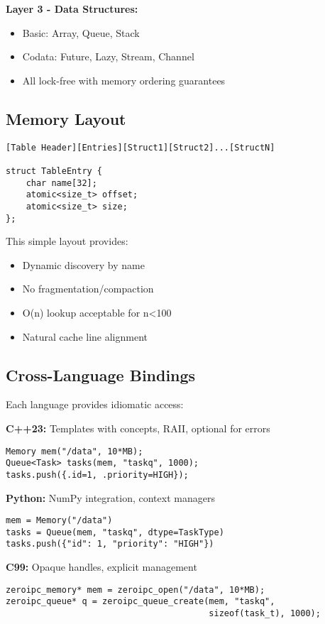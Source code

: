 \documentclass[sigconf,anonymous]{acmart}
\begin{document}
\textbf{Layer 3 - Data Structures:}
\begin{itemize}
\item Basic: Array, Queue, Stack
\item Codata: Future, Lazy, Stream, Channel
\item All lock-free with memory ordering guarantees
\end{itemize}

\subsection{Memory Layout}

\begin{lstlisting}[caption={Linear Memory Layout}]
[Table Header][Entries][Struct1][Struct2]...[StructN]

struct TableEntry {
    char name[32];
    atomic<size_t> offset;  
    atomic<size_t> size;
};
\end{lstlisting}

This simple layout provides:
\begin{itemize}
\item Dynamic discovery by name
\item No fragmentation/compaction
\item O(n) lookup acceptable for n<100
\item Natural cache line alignment
\end{itemize}

\subsection{Cross-Language Bindings}

Each language provides idiomatic access:

\textbf{C++23:} Templates with concepts, RAII, optional for errors
\begin{lstlisting}
Memory mem("/data", 10*MB);
Queue<Task> tasks(mem, "taskq", 1000);
tasks.push({.id=1, .priority=HIGH});
\end{lstlisting}

\textbf{Python:} NumPy integration, context managers
\begin{lstlisting}
mem = Memory("/data")
tasks = Queue(mem, "taskq", dtype=TaskType)
tasks.push({"id": 1, "priority": "HIGH"})
\end{lstlisting}

\textbf{C99:} Opaque handles, explicit management
\begin{lstlisting}
zeroipc_memory* mem = zeroipc_open("/data", 10*MB);
zeroipc_queue* q = zeroipc_queue_create(mem, "taskq", 
                                        sizeof(task_t), 1000);
\end{lstlisting}
\end{document}
